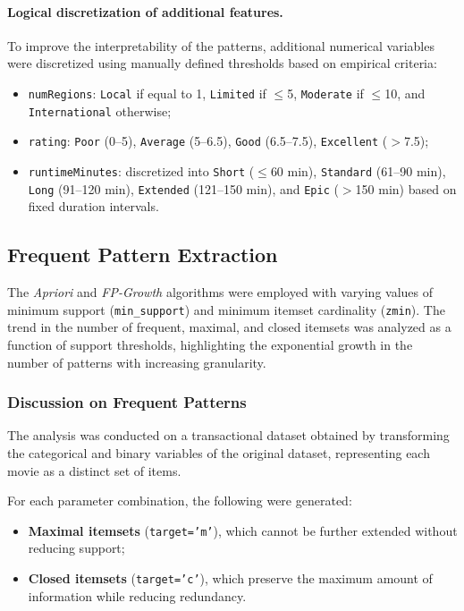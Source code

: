 \documentclass[10pt]{article}
\begin{document}
\paragraph{Logical discretization of additional features.}
To improve the interpretability of the patterns, additional numerical variables were discretized using manually defined thresholds based on empirical criteria:

\begin{itemize}
  \item \texttt{numRegions}: \texttt{Local} if equal to 1, \texttt{Limited} if $\leq$5, \texttt{Moderate} if $\leq$10, and \texttt{International} otherwise;
  \item \texttt{rating}: \texttt{Poor} (0--5), \texttt{Average} (5--6.5), \texttt{Good} (6.5--7.5), \texttt{Excellent} ($>$7.5);
\item \texttt{runtimeMinutes}: discretized into \texttt{Short} ($\leq$60 min), \texttt{Standard} (61–90 min), \texttt{Long} (91–120 min), \texttt{Extended} (121–150 min), and \texttt{Epic} ($>$150 min) based on fixed duration intervals.

\end{itemize}

\subsection{Frequent Pattern Extraction}
The \textit{Apriori} and \textit{FP-Growth} algorithms were employed with varying values of minimum support (\texttt{min\_support}) and minimum itemset cardinality (\texttt{zmin}). The trend in the number of frequent, maximal, and closed itemsets was analyzed as a function of support thresholds, highlighting the exponential growth in the number of patterns with increasing granularity.
\subsubsection{Discussion on Frequent Patterns}

The analysis was conducted on a transactional dataset obtained by transforming the categorical and binary variables of the original dataset, representing each movie as a distinct set of items.

For each parameter combination, the following were generated:
\begin{itemize}
    \item \textbf{Maximal itemsets} (\texttt{target='m'}), which cannot be further extended without reducing support;
    \item \textbf{Closed itemsets} (\texttt{target='c'}), which preserve the maximum amount of information while reducing redundancy.
\end{itemize}
\end{document}

